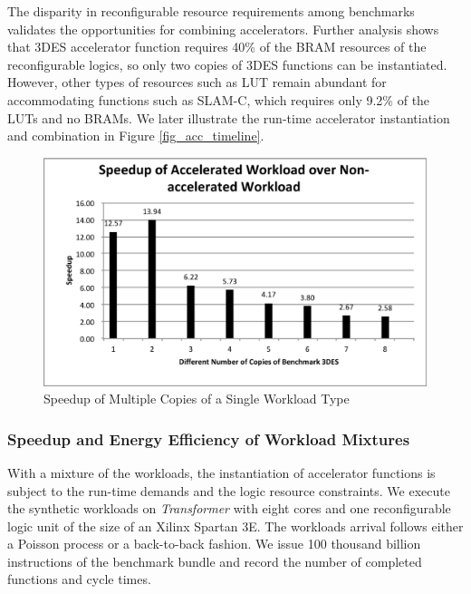 The disparity in reconfigurable resource requirements among benchmarks
validates the opportunities for combining accelerators. Further
analysis shows that 3DES accelerator function requires 40\% of 
the BRAM resources of the reconfigurable logics, so only two copies of
3DES functions can be instantiated. However, other types of
resources such as LUT remain abundant for accommodating
functions such as SLAM-C, which requires only 9.2\% of the LUTs and no
BRAMs. We later illustrate the run-time accelerator instantiation and combination in Figure
\ref{fig_acc_timeline}.   

\begin{figure}
    \centering
    \includegraphics[width=4.5in]{Increase-Num-of-Apps}
    \caption{Speedup of Multiple Copies of a Single Workload Type}
    \label{fig_num_of_apps}
\end{figure}

\subsubsection{Speedup and Energy Efficiency of Workload Mixtures}

With a mixture of the workloads, the instantiation of accelerator
functions is subject to the run-time demands and the logic resource
constraints. We execute the synthetic workloads on {\em Transformer} with eight
cores and one reconfigurable logic unit of the size of an Xilinx
Spartan 3E. The workloads arrival follows either a Poisson process or
a back-to-back fashion.  We issue 100 thousand billion instructions of
the benchmark bundle and record the number of completed functions and
cycle times. 

